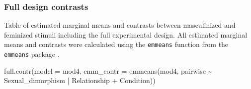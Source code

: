 \documentclass[
  bookmarksnumbered]{article}
\newenvironment{Shaded}{\begin{snugshade}}{\end{snugshade}}
\newcommand{\AttributeTok}[1]{\textcolor[rgb]{0.80,0.80,0.80}{#1}}
\newcommand{\FunctionTok}[1]{\textcolor[rgb]{0.94,0.94,0.56}{#1}}
\newcommand{\NormalTok}[1]{\textcolor[rgb]{0.80,0.80,0.80}{#1}}
\newcommand{\SpecialCharTok}[1]{\textcolor[rgb]{0.86,0.64,0.64}{#1}}
\begin{document}
\subsubsection{Full design contrasts}\label{full-design-contrasts-3}

Table of estimated marginal means and contrasts between masculinized and feminized stimuli including the full experimental design. All estimated marginal means and contrasts were calculated using the \texttt{emmeans} function from the \texttt{emmeans} package \autocite{emmeanscit}.

\begin{Shaded}
\begin{Highlighting}[]
\FunctionTok{full.contr}\NormalTok{(}\AttributeTok{model =}\NormalTok{ mod4,}
           \AttributeTok{emm\_contr =} \FunctionTok{emmeans}\NormalTok{(mod4, pairwise }\SpecialCharTok{\textasciitilde{}}\NormalTok{ Sexual\_dimorphism }\SpecialCharTok{|}\NormalTok{ Relationship }\SpecialCharTok{+}\NormalTok{ Condition))}
\end{Highlighting}
\end{Shaded}
\end{document}

